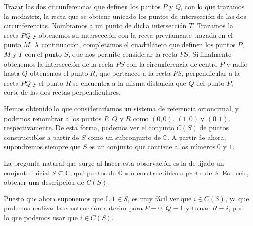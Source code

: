 \begin{figure}[H]
    \centering
\end{figure}

Trazar las dos circunferencias que definen los puntos $P$ y $Q$, con lo que trazamos la mediatriz, la recta que se obtiene uniendo los puntos de intersección de las dos circunferencias. Nombramos a un punto de dicha intersección $T$. Trazamos la recta $PQ$ y obtenemos su intersección con la recta previamente trazada en el punto $M$. A continuación, completamos el cuadrilátero que definen los puntos $P$, $M$ y $T$ con el punto $S$, que nos permite considerar la recta $PS$. Si finalmente obtenemos la intersección de la recta $PS$ con la circunferencia de centro $P$ y radio hasta $Q$ obtenemos el punto $R$, que pertenece a la recta $PS$, perpendicular a la recta $PQ$ y el punto $R$ se encuentra a la misma distancia que $Q$ del punto $P$, corte de las dos rectas perpendiculares.

Hemos obtenido lo que consideraríamos un sistema de referencia ortonormal, y podemos renombrar a los puntos $P$, $Q$ y $R$ como $(0,0)$, $(1,0)$ y $(0,1)$, respectivamente. De esta forma, podemos ver el conjunto $C(S)$ de puntos constructibles a partir de $S$ como un subconjunto de $\mathbb{C}$. A partir de ahora, supondremos siempre que $S$ es un conjunto que contiene a los números $0$ y $1$.

La pregunta natural que surge al hacer esta observación es la de fijado un conjunto inicial $S\subseteq \mathbb{C}$, qué puntos de $\mathbb{C}$ son constructibles a partir de $S$. Es decir, obtener una descripción de $C(S)$.

\begin{observacion}
    Puesto que ahora suponemos que $0,1\in S$, es muy fácil ver que $i \in C(S)$, ya que podemos realizar la construcción anterior para $P = 0$, $Q= 1$ y tomar $R = i$, por lo que podemos usar que $i \in C(S)$.
\end{observacion}

